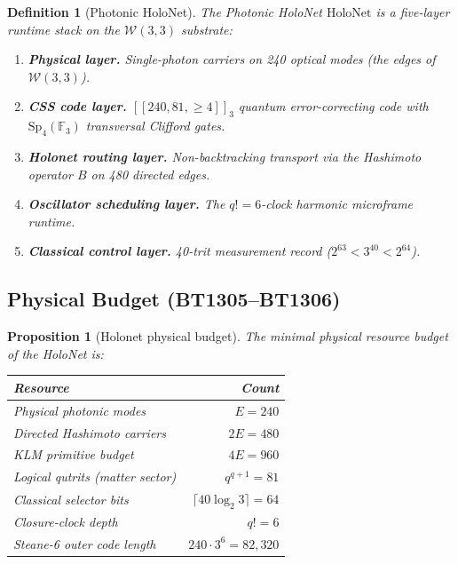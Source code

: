 \documentclass[12pt,a4paper]{article}
\newtheorem{proposition}[theorem]{Proposition}
\newtheorem{definition}[theorem]{Definition}
\newcommand{\W}{\mathcal{W}(3,3)}
\newcommand{\Sp}{\mathrm{Sp}_4(\mathbb{F}_3)}
\newcommand{\Hol}{\mathrm{HoloNet}}
\begin{document}
\begin{definition}[Photonic HoloNet]
  The \emph{Photonic HoloNet} $\Hol$ is a five-layer runtime stack on the
  $\W$ substrate:
  \begin{enumerate}
    \item \textbf{Physical layer.} Single-photon carriers on 240 optical
          modes (the edges of $\W$).
    \item \textbf{CSS code layer.} $[[240,81,\ge 4]]_3$ quantum
          error-correcting code with $\Sp$ transversal Clifford gates.
    \item \textbf{Holonet routing layer.} Non-backtracking transport
          via the Hashimoto operator $B$ on 480 directed edges.
    \item \textbf{Oscillator scheduling layer.} The $q!=6$-clock
          harmonic microframe runtime.
    \item \textbf{Classical control layer.} 40-trit measurement record
          ($2^{63} < 3^{40} < 2^{64}$).
  \end{enumerate}
\end{definition}

\subsection{Physical Budget (BT1305--BT1306)}

\begin{proposition}[Holonet physical budget]
  The minimal physical resource budget of the HoloNet is:
  \begin{center}
  \begin{tabular}{lr}
  \toprule
  Resource & Count\\
  \midrule
  Physical photonic modes & $E = 240$\\
  Directed Hashimoto carriers & $2E = 480$\\
  KLM primitive budget & $4E = 960$\\
  Logical qutrits (matter sector) & $q^{q+1} = 81$\\
  Classical selector bits & $\lceil 40\log_2 3 \rceil = 64$\\
  Closure-clock depth & $q! = 6$\\
  Steane-6 outer code length & $240\cdot 3^6 = 82{,}320$\\
  \bottomrule
  \end{tabular}
  \end{center}
\end{proposition}
\end{document}
